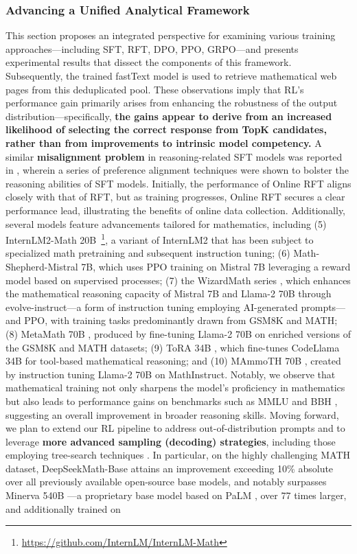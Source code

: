 {\begin{itemize}[topsep=0pt]
\begin{itemize}[topsep=0pt]
\subsubsection{Advancing a Unified Analytical Framework} This section proposes an integrated perspective for examining various training approaches—including SFT, RFT, DPO, PPO, GRPO—and presents experimental results that dissect the components of this framework. Subsequently, the trained fastText model is used to retrieve mathematical web pages from this deduplicated pool. These observations imply that RL's performance gain primarily arises from enhancing the robustness of the output distribution—specifically, \textbf{the gains appear to derive from an increased likelihood of selecting the correct response from TopK candidates, rather than from improvements to intrinsic model competency.} A similar \textbf{misalignment problem} in reasoning-related SFT models was reported in \citep{wang2023making}, wherein a series of preference alignment techniques \citep{yuan2023rrhf,song2023preference,wang2023making} were shown to bolster the reasoning abilities of SFT models. Initially, the performance of Online RFT aligns closely with that of RFT, but as training progresses, Online RFT secures a clear performance lead, illustrating the benefits of online data collection. Additionally, several models feature advancements tailored for mathematics, including (5) InternLM2-Math 20B~\footnote{\url{https://github.com/InternLM/InternLM-Math}}, a variant of InternLM2 that has been subject to specialized math pretraining and subsequent instruction tuning; (6) Math-Shepherd-Mistral 7B, which uses PPO training \citep{schulman2017proximal} on Mistral 7B \citep{mistral} leveraging a reward model based on supervised processes; (7) the WizardMath series \citep{wizardmath}, which enhances the mathematical reasoning capacity of Mistral 7B and Llama-2 70B \citep{llama2} through evolve-instruct—a form of instruction tuning employing AI-generated prompts—and PPO, with training tasks predominantly drawn from GSM8K and MATH; (8) MetaMath 70B \citep{metamath}, produced by fine-tuning Llama-2 70B on enriched versions of the GSM8K and MATH datasets; (9) ToRA 34B \cite{tora}, which fine-tunes CodeLlama 34B for tool-based mathematical reasoning; and (10) MAmmoTH 70B \citep{MathInstruct}, created by instruction tuning Llama-2 70B on MathInstruct. Notably, we observe that mathematical training not only sharpens the model’s proficiency in mathematics but also leads to performance gains on benchmarks such as MMLU \citep{mmlu} and BBH \citep{bbh}, suggesting an overall improvement in broader reasoning skills. Moving forward, we plan to extend our RL pipeline to address out-of-distribution prompts and to leverage \textbf{more advanced sampling (decoding) strategies}, including those employing tree-search techniques \citep{yao2023tree}. In particular, on the highly challenging MATH dataset, DeepSeekMath-Base attains an improvement exceeding 10\% absolute over all previously available open-source base models, and notably surpasses Minerva 540B \citep{minerva}—a proprietary base model based on PaLM \citep{palm}, over 77 times larger, and additionally trained on 
\end{itemize}
\end{itemize}}
